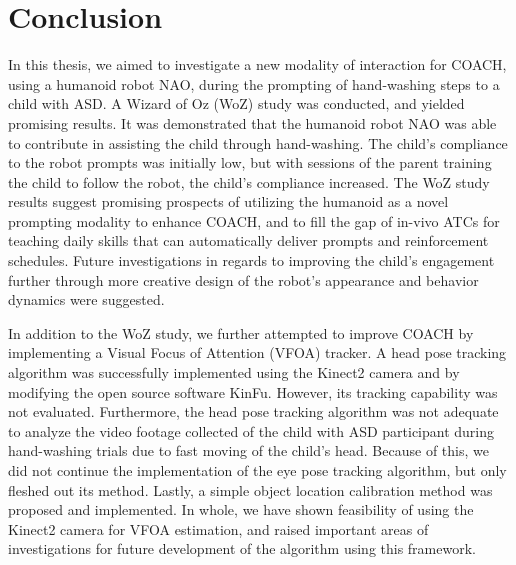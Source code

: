 \chapter{Conclusion}
In this thesis, we aimed to investigate a new modality of interaction for COACH, using a humanoid robot NAO, during the prompting of hand-washing steps to a child with ASD.  A Wizard of Oz (WoZ) study was conducted, and yielded promising results.  It was demonstrated that the humanoid robot NAO was able to contribute in assisting the child through hand-washing.  The child's compliance to the robot prompts was initially low, but with sessions of the parent training the child to follow the robot, the child's compliance increased.  The WoZ study results suggest promising prospects of utilizing the humanoid as a novel prompting modality to enhance COACH, and to fill the gap of in-vivo ATCs for teaching daily skills that can automatically deliver prompts and reinforcement schedules.  Future investigations in regards to improving the child's engagement further through more creative design of the robot's appearance and behavior dynamics were suggested.

In addition to the WoZ study, we further attempted to improve COACH by implementing a Visual Focus of Attention (VFOA) tracker.  A head pose tracking algorithm was successfully implemented using the Kinect2 camera and by modifying the open source software KinFu.  However, its tracking capability was not evaluated.  Furthermore, the head pose tracking algorithm was not adequate to analyze the video footage collected of the child with ASD participant during hand-washing trials due to fast moving of the child's head.  Because of this, we did not continue the implementation of the eye pose tracking algorithm, but only fleshed out its method.  Lastly, a simple object location calibration method was proposed and implemented.  In whole, we have shown feasibility of using the Kinect2 camera for VFOA estimation, and raised important areas of investigations for future development of the algorithm using this framework.